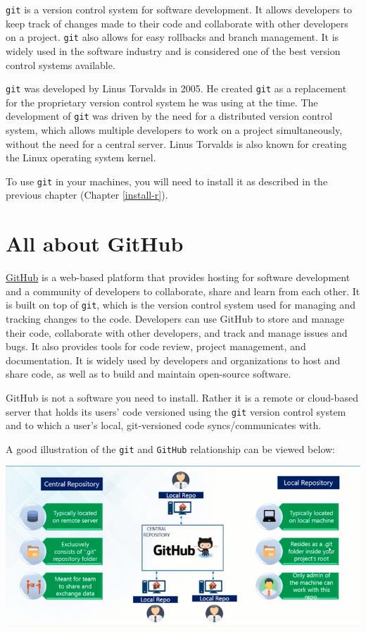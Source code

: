 \documentclass[
  12pt,
]{book}
\begin{document}
\texttt{git} is a version control system for software development. It allows developers to keep track of changes made to their code and collaborate with other developers on a project. \texttt{git} also allows for easy rollbacks and branch management. It is widely used in the software industry and is considered one of the best version control systems available.

\texttt{git} was developed by Linus Torvalds in 2005. He created \texttt{git} as a replacement for the proprietary version control system he was using at the time. The development of \texttt{git} was driven by the need for a distributed version control system, which allows multiple developers to work on a project simultaneously, without the need for a central server. Linus Torvalds is also known for creating the Linux operating system kernel.

To use \texttt{git} in your machines, you will need to install it as described in the previous chapter (Chapter \ref{install-r}).

\hypertarget{all-about-github}{%
\section{All about GitHub}\label{all-about-github}}

\href{https://github.com}{GitHub} is a web-based platform that provides hosting for software development and a community of developers to collaborate, share and learn from each other. It is built on top of \texttt{git}, which is the version control system used for managing and tracking changes to the code. Developers can use GitHub to store and manage their code, collaborate with other developers, and track and manage issues and bugs. It also provides tools for code review, project management, and documentation. It is widely used by developers and organizations to host and share code, as well as to build and maintain open-source software.

GitHub is not a software you need to install. Rather it is a remote or cloud-based server that holds its users' code versioned using the \texttt{git} version control system and to which a user's local, git-versioned code syncs/communicates with.

A good illustration of the \texttt{git} and \texttt{GitHub} relationship can be viewed below:

\includegraphics{images/git_and_github01b.png}
\end{document}

